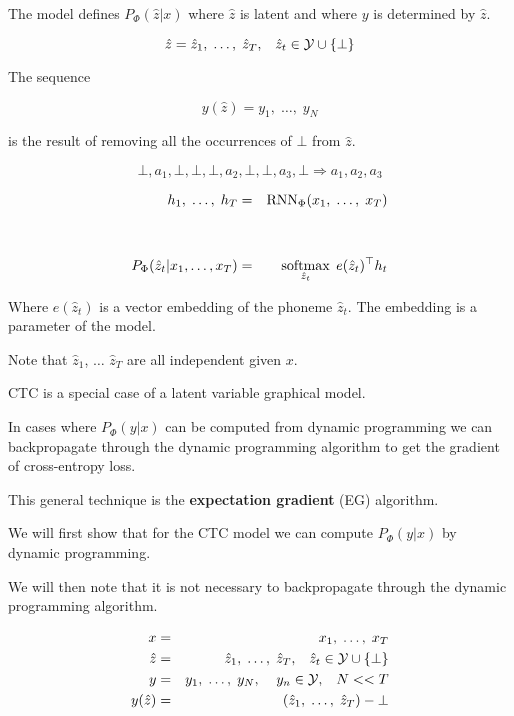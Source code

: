 {
The model defines $P_\Phi(\hat{z}|x)$ where $\hat{z}$ is latent and where $y$ is determined by $\hat{z}$.

\vfill
$$\hat{z} = \hat{z}_1,\;\ldots,\;\hat{z}_T,\;\;\;\hat{z}_t \in {\cal Y} \cup \{\bot\}$$

\vfill
The sequence

\vfill
$$y(\hat{z}) = y_1,\;\ldots,\;y_N$$

\vfill
is the result of removing all the occurrences of $\bot$ from $\hat{z}$.

$$\bot,a_1,\bot,\bot,\bot,a_2,\bot,\bot,a_3,\bot \Rightarrow a_1,a_2,a_3$$


\begin{eqnarray*}
  h_1,\;\ldots,\;h_T & = & \mathrm{RNN}_\Phi(x_1,\;\ldots,\;x_T) \\
  \\
  \\
  P_\Phi(\hat{z}_t|x_1,\ldots,x_T) & = & \operatorname*{softmax}_{\hat{z}_t} \;e(\hat{z}_t)^\top h_t
\end{eqnarray*}

\vfill
Where $e(\hat{z}_t)$ is a vector embedding of the phoneme $\hat{z}_t$.  The embedding is a parameter of the model.

\vfill
Note that $\hat{z}_1$, $\ldots$ $\hat{z}_T$ are all independent given $x$.


CTC is a special case of a latent variable graphical model.

\vfill
In cases where $P_\Phi(y|x)$ can be computed from dynamic programming
we can backpropagate through the dynamic programming algorithm to get the gradient of cross-entropy loss.

\vfill
This general technique is the {\bf expectation gradient} (EG) algorithm.

\vfill
We will first show that for the CTC model we can compute $P_\Phi(y|x)$ by
dynamic programming.

\vfill
We will then note that it is not necessary to backpropagate through the dynamic programming algorithm.

\begin{eqnarray*}
  x & = & x_1,\;\ldots,\; x_T \\
  \hat{z} & = & \hat{z}_1, \;\ldots,\;\hat{z}_T,\;\;\;\hat{z}_t \in {\cal Y}\cup \{\bot\} \\
  y & = & y_1,\;\ldots,\;y_N,\;\;\;\;y_n \in {\cal Y},\;\;\;N << T \\
  y(\hat{z}) & = & (\hat{z}_1,\;\ldots,\;\hat{z}_T) - \bot
\end{eqnarray*}

}
